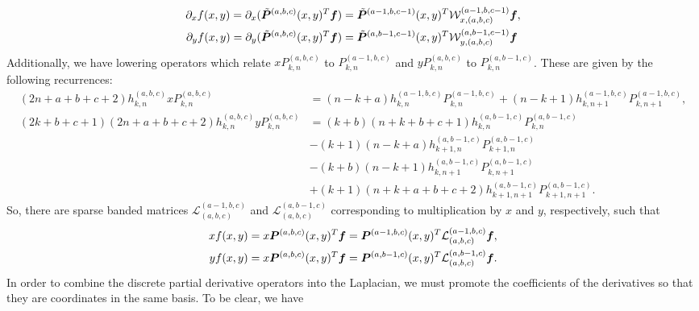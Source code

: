 \begin{align}
	\partial_x f(x,y) = \partial_x (\tilde{\boldsymbol{P}}^{(a,b,c)}(x,y)^T\boldsymbol{f}) &= \tilde{\boldsymbol{P}}^{(a-1,b,c-1)}(x,y)^T \mathcal{W}_{x,(a,b,c)}^{(a-1,b,c-1)}\boldsymbol{f},\\
	\partial_y f(x,y) = \partial_y (\tilde{\boldsymbol{P}}^{(a,b,c)}(x,y)^T\boldsymbol{f}) &= \tilde{\boldsymbol{P}}^{(a,b-1,c-1)}(x,y)^T \mathcal{W}_{y,(a,b,c)}^{(a,b-1,c-1)}\boldsymbol{f}
\end{align}
Additionally, we have lowering operators which relate $xP_{k,n}^{(a,b,c)}$ to $P_{k,n}^{(a-1,b,c)}$ and $yP_{k,n}^{(a,b,c)}$ to $P_{k,n}^{(a,b-1,c)}$. These are given by the following recurrences:
\begin{align}
(2n+a+b+c+2)h_{k,n}^{(a,b,c)}xP_{k,n}^{(a,b,c)} &= (n-k+a)h_{k,n}^{(a-1,b,c)}P_{k,n}^{(a-1,b,c)} + (n-k+1)h_{k,n+1}^{(a-1,b,c)}P_{k,n+1}^{(a-1,b,c)},\\
(2k+b+c+1)(2n+a+b+c+2)h_{k,n}^{(a,b,c)}yP_{k,n}^{(a,b,c)} &= (k+b)(n+k+b+c+1)h_{k,n}^{(a,b-1,c)}P_{k,n}^{(a,b-1,c)} \nonumber \\
&-(k+1)(n-k+a)h_{k+1,n}^{(a,b-1,c)}P_{k+1,n}^{(a,b-1,c)} \nonumber \\
&-(k+b)(n-k+1)h_{k,n+1}^{(a,b-1,c)}P_{k,n+1}^{(a,b-1,c)} \nonumber \\
&+(k+1)(n+k+a+b+c+2)h_{k+1,n+1}^{(a,b-1,c)}P_{k+1,n+1}^{(a,b-1,c)}.
\end{align}
So, there are sparse banded matrices $\mathcal{L}_{(a,b,c)}^{(a-1,b,c)}$ and $\mathcal{L}_{(a,b,c)}^{(a,b-1,c)}$ corresponding to multiplication by $x$ and $y$, respectively, such that
\begin{align}
	xf(x,y) &= x\boldsymbol{P}^{(a,b,c)}(x,y)^T\boldsymbol{f} = \boldsymbol{P}^{(a-1,b,c)}(x,y)^T\mathcal{L}_{(a,b,c)}^{(a-1,b,c)}\boldsymbol{f},\\
	yf(x,y) &= x\boldsymbol{P}^{(a,b,c)}(x,y)^T\boldsymbol{f} = \boldsymbol{P}^{(a,b-1,c)}(x,y)^T\mathcal{L}_{(a,b,c)}^{(a,b-1,c)}\boldsymbol{f}.
\end{align}
In order to combine the discrete partial derivative operators into the Laplacian, we must promote the coefficients of the derivatives so that they are coordinates in the same basis. To be clear, we have
